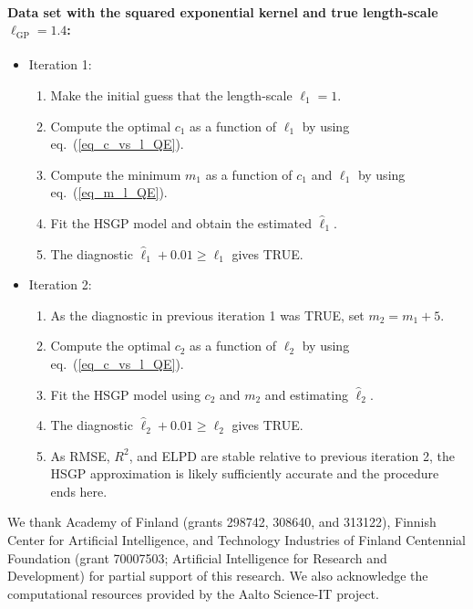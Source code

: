 \paragraph*{Data set with the squared exponential kernel and true length-scale $\ell_{\text{GP}} = 1.4$:} 
\begin{itemize}
\item[] Iteration 1:
	\begin{enumerate}
	\item Make the initial guess that the length-scale $\ell_1=1$.
	
	\item Compute the optimal $c_1$ as a function of $\ell_1$ by using eq.~(\ref{eq_c_vs_l_QE}).
	
	\item Compute the minimum $m_1$ as a function of $c_1$ and $\ell_1$ by using eq.~(\ref{eq_m_l_QE}).
	
	\item Fit the HSGP model and obtain the estimated $\hat{\ell}_1$.
	
	\item The diagnostic $\hat{\ell}_1 + 0.01 \geq \ell_1$ gives TRUE.
	\end{enumerate}
	
\item[] Iteration 2:
	\begin{enumerate}
	\item As the diagnostic in previous iteration 1 was TRUE, set $m_2 = m_1 + 5$.
	
	\item Compute the optimal $c_2$ as a function of $\ell_2$ by using eq.~(\ref{eq_c_vs_l_QE}).
	
	\item Fit the HSGP model using $c_2$ and $m_2$ and estimating $\hat{\ell}_2$.
	
	\item The diagnostic $\hat{\ell}_2 + 0.01 \geq \ell_2$ gives TRUE.
	
	\item As RMSE, $R^2$, and ELPD are stable relative to previous iteration 2, the HSGP approximation is likely sufficiently accurate and the procedure ends here.
	\end{enumerate}
	
\end{itemize}




\begin{acknowledgements}
We thank Academy of Finland (grants 298742, 308640, and 313122), Finnish Center for Artificial Intelligence, and Technology Industries of Finland Centennial Foundation (grant 70007503; Artificial Intelligence for Research and Development) for partial support of this research. We also acknowledge the computational resources provided by the Aalto Science-IT project.
\end{acknowledgements}


